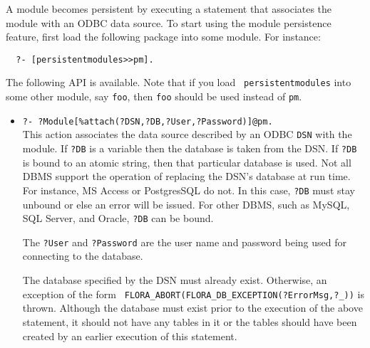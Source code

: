 A module becomes persistent by executing a statement that associates the
module with an ODBC data source. To start using the module persistence
feature, first load the following package into some module. For instance:
\begin{verbatim}
  ?- [persistentmodules>>pm].
\end{verbatim}
The following API is available. Note that if you load {\tt
  persistentmodules} into some other module, say {\tt foo}, then {\tt foo}
should be used instead of {\tt pm}.    
\begin{itemize}
\item {\tt ?- ?Module[\%attach(?DSN,?DB,?User,?Password)]@pm.}\\
  This action associates the data source described by an ODBC {\tt DSN}
  with the module.  If {\tt ?DB} is a variable then the database is taken
  from the DSN. If {\tt ?DB} is bound to an atomic string, then that particular
  database is used. Not all DBMS support the operation of replacing the
  DSN's database at run time. For instance, MS Access or PostgresSQL do not.
  In this case, {\tt ?DB} must stay unbound or else an error will be issued.
  For other DBMS, such as MySQL, SQL Server, and Oracle, {\tt ?DB} can be
  bound. 

  The {\tt ?User} and {\tt ?Password} are the user name and password being
  used for connecting to the database.

  The database specified by the DSN must already exist. Otherwise, an
  exception of the form {\tt
    FLORA\_ABORT(FLORA\_DB\_EXCEPTION(?ErrorMsg,?\_))} is thrown.
  Although the database must exist prior to the execution of the above
  statement, it should not have any tables in it or the tables should have
  been created by an earlier execution of this statement.


\end{itemize}
